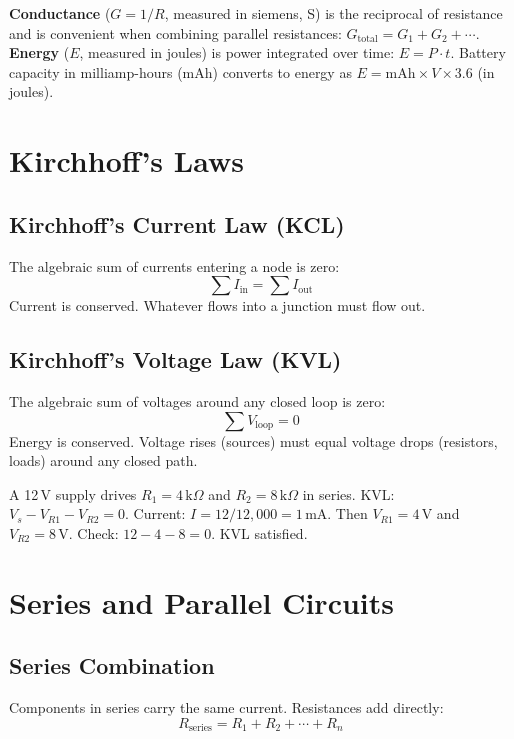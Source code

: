 \textbf{Conductance} ($G = 1/R$, measured in siemens, S) is the reciprocal of resistance and is convenient when combining parallel resistances: $G_{\text{total}} = G_1 + G_2 + \cdots$. \textbf{Energy} ($E$, measured in joules) is power integrated over time: $E = P \cdot t$. Battery capacity in milliamp-hours (mAh) converts to energy as $E = \text{mAh} \times V \times 3.6$ (in joules).


\section{Kirchhoff's Laws}

\subsection{Kirchhoff's Current Law (KCL)}
The algebraic sum of currents entering a node is zero:
\begin{equation}
\sum I_{\text{in}} = \sum I_{\text{out}}
\end{equation}
Current is conserved. Whatever flows into a junction must flow out.

\subsection{Kirchhoff's Voltage Law (KVL)}
The algebraic sum of voltages around any closed loop is zero:
\begin{equation}
\sum V_{\text{loop}} = 0
\end{equation}
Energy is conserved. Voltage rises (sources) must equal voltage drops (resistors, loads) around any closed path.

\begin{tipbox}
A 12\,V supply drives $R_1 = 4\,\text{k}\Omega$ and $R_2 = 8\,\text{k}\Omega$ in series. KVL: $V_s - V_{R1} - V_{R2} = 0$. Current: $I = 12/12{,}000 = 1\,\text{mA}$. Then $V_{R1} = 4\,\text{V}$ and $V_{R2} = 8\,\text{V}$. Check: $12 - 4 - 8 = 0$. KVL satisfied.
\end{tipbox}


\section{Series and Parallel Circuits}

\subsection{Series Combination}
Components in series carry the same current. Resistances add directly:
\begin{equation}
R_{\text{series}} = R_1 + R_2 + \cdots + R_n
\end{equation}

